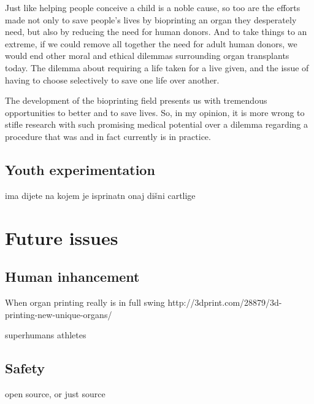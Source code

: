 \documentclass[12pt]{article} %
\begin{document}
Just like helping people conceive a child is a noble cause, so too are the efforts made not only to save people's lives by bioprinting an organ they desperately need, but also by reducing the need for human donors. And to take things to an extreme, if we could remove all together the need for adult human donors, we would end other moral and ethical dilemmas surrounding organ transplants today. The dilemma about requiring a life taken for a live given, and the issue of having to choose selectively to save one life over another. 

The development of the bioprinting field presents us with tremendous opportunities to better and to save lives. So, in my opinion, it is more wrong to stifle research with such promising medical potential over a dilemma regarding a procedure that was and in fact currently is in practice.




\subsection{Youth experimentation} %
ima dijete na kojem je isprinatn onaj dišni cartlige


\newpage 


\section{Future issues} %

\subsection{Human inhancement} %
When organ printing really is in full swing
http://3dprint.com/28879/3d-printing-new-unique-organs/

superhumans
athletes


\subsection{Safety} %
open source, or just source
\end{document}
